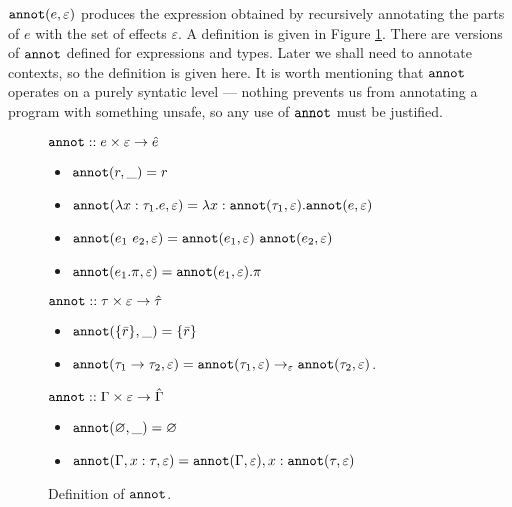 $\mathtt{annot}(e, \varepsilon)$ produces the expression obtained by
recursively annotating the parts of $e$ with the set of effects
$\varepsilon$. A definition is given in Figure
\ref{fig:annot_defn}. There are versions of $\mathtt{annot}$ defined for
expressions and types. Later we shall need to annotate contexts, so
the definition is given here. It is worth mentioning that
$\mathtt{annot}$ operates on a purely syntatic level --- nothing prevents
us from annotating a program with something unsafe, so any use of
$\mathtt{annot}$ must be justified.

\begin{figure}[h]
\vspace{-5pt}

$\mathtt{annot} :: e \times \varepsilon \rightarrow \hat e$

\begin{itemize}
	\setlength\itemsep{-0.2em}
	\item[] $\mathtt{annot}(r, \_) = r$
	\item[] $\mathtt{annot}(\lambda x: \tau_1 . e, \varepsilon) = \lambda x: \mathtt{annot}(\tau_1, \varepsilon) . \mathtt{annot}(e, \varepsilon)$
	\item[] $\mathtt{annot}(e_1~e_2, \varepsilon) = \mathtt{annot}(e_1, \varepsilon)~\mathtt{annot}(e_2, \varepsilon)$
	\item[] $\mathtt{annot}(e_1.\pi, \varepsilon) = \mathtt{annot}(e_1, \varepsilon).\pi$
\end{itemize}
	
$\mathtt{annot} :: \tau \times \varepsilon \rightarrow \hat \tau$

\begin{itemize}
	\setlength\itemsep{-0.2em}
	\item[] $\mathtt{annot}(\{ \bar r \}, \_) = \{ \bar r \}$
	\item[] $\mathtt{annot}(\tau_1 \rightarrow \tau_2, \varepsilon) = \mathtt{annot}(\tau_1, \varepsilon) \rightarrow_{\varepsilon} \mathtt{annot}(\tau_2, \varepsilon)$.	
\end{itemize}

$\mathtt{annot} :: \Gamma \times \varepsilon \rightarrow \hat \Gamma$

\begin{itemize}
	\setlength\itemsep{-0.2em}
	\item[] $\mathtt{annot}(\varnothing, \_) = \varnothing$
	\item[] $\mathtt{annot}(\Gamma, x: \tau, \varepsilon) = \mathtt{annot}(\Gamma, \varepsilon), x: \mathtt{annot}(\tau, \varepsilon)$
\end{itemize}

\vspace{-7pt}
\caption{Definition of $\mathtt{annot}$.}
\label{fig:annot_defn}
\end{figure}

